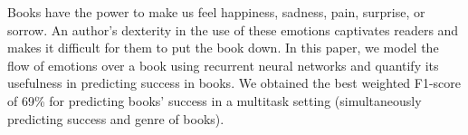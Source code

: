 Books have the power to make us feel happiness, sadness, pain, surprise, or sorrow. An author's dexterity in the use of these emotions captivates readers and makes it difficult for them to put the book down. In this paper, we model the flow of emotions over a book using recurrent neural networks and quantify its usefulness in predicting success in books. We obtained the best weighted F1-score of 69\% for predicting books' success in a multitask setting (simultaneously predicting success and genre of books).
